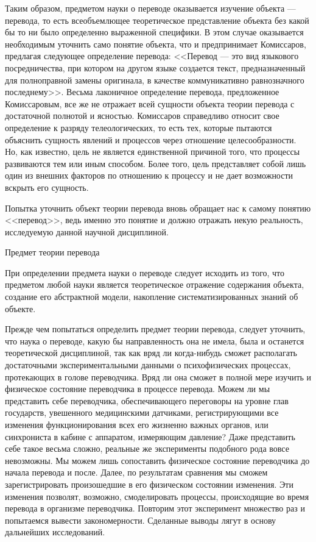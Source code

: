 Таким образом, предметом науки о переводе оказывается изучение объекта --- перевода, то есть всеобъемлющее теоретическое представление объекта без какой бы то ни было определенно выраженной специфики. В этом случае оказывается необходимым уточнить само понятие объекта, что и предпринимает Комиссаров, предлагая следующее определение перевода: <<Перевод --- это вид языкового посредничества, при котором на другом языке создается текст, предназначенный для полноправной замены оригинала, в качестве коммуникативно равнозначного последнему>>. Весьма лаконичное определение перевода, предложенное Комиссаровым, все же не отражает всей сущности объекта теории перевода с достаточной полнотой и ясностью. Комиссаров справедливо относит свое определение к разряду телеологических, то есть тех, которые пытаются объяснить сущность явлений и процессов через отношение целесообразности. Но, как известно, цель не является единственной причиной того, что процессы развиваются тем или иным способом. Более того, цель представляет собой лишь один из внешних факторов по отношению к процессу и не дает возможности вскрыть его сущность.

Попытка уточнить объект теории перевода вновь обращает нас к самому понятию <<перевод>>, ведь именно это понятие и должно отражать некую реальность, исследуемую данной научной дисциплиной.

Предмет теории перевода

При определении предмета науки о переводе следует исходить из того, что предметом любой науки является теоретическое отражение содержания объекта, создание его абстрактной модели, накопление систематизированных знаний об объекте.

Прежде чем попытаться определить предмет теории перевода, следует уточнить, что наука о переводе, какую бы направленность она не имела, была и останется теоретической дисциплиной, так как вряд ли когда-нибудь сможет располагать достаточными экспериментальными данными о психофизических процессах, протекающих в голове переводчика. Вряд ли она сможет в полной мере изучить и физическое состояние переводчика в процессе перевода. Можем ли мы представить себе переводчика, обеспечивающего переговоры на уровне глав государств, увешенного медицинскими датчиками, регистрирующими все изменения функционирования всех его жизненно важных органов, или синхрониста в кабине с аппаратом, измеряющим давление? Даже представить себе такое весьма сложно, реальные же эксперименты подобного рода вовсе невозможны. Мы можем лишь сопоставить физическое состояние переводчика до начала перевода и после. Далее, по результатам сравнения мы сможем зарегистрировать произошедшие в его физическом состоянии изменения. Эти изменения позволят, возможно, смоделировать процессы, происходящие во время перевода в организме переводчика. Повторим этот эксперимент множество раз и попытаемся вывести закономерности. Сделанные выводы лягут в основу дальнейших исследований.

